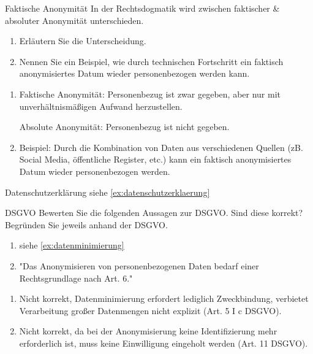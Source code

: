 \documentclass{article}
\begin{document}
\begin{exercise}{Faktische Anonymität}
  In der Rechtsdogmatik wird zwischen faktischer \& absoluter Anonymität unterschieden.
  \begin{enumerate}
    \item Erläutern Sie die Unterscheidung.
    \item Nennen Sie ein Beispiel, wie durch technischen Fortschritt ein faktisch anonymisiertes Datum wieder personenbezogen werden kann.
  \end{enumerate}

  \begin{solution}
    \begin{enumerate}
      \item Faktische Anonymität: Personenbezug ist zwar gegeben, aber nur mit unverhältnismäßigen Aufwand herzustellen.\par Absolute Anonymität: Personenbezug ist nicht gegeben.
      \item Beispiel: Durch die Kombination von Daten aus verschiedenen Quellen (zB. Social Media, öffentliche Register, etc.) kann ein faktisch anonymisiertes Datum wieder personenbezogen werden.
    \end{enumerate}
  \end{solution}
\end{exercise}

\begin{exercise}{Datenschutzerklärung}
  siehe \ref{ex:datenschutzerklaerung}
\end{exercise}

\begin{exercise}[2]{DSGVO}
  Bewerten Sie die folgenden Aussagen zur DSGVO. Sind diese korrekt? Begründen Sie jeweils anhand der DSGVO.
  \begin{enumerate}
    \item siehe \ref{ex:datenminimierung}
    \item "Das Anonymisieren von personenbezogenen Daten bedarf einer Rechtsgrundlage nach Art. 6."
  \end{enumerate}

  \begin{solution}
    \begin{enumerate}
      \item Nicht korrekt, Datenminimierung erfordert lediglich Zweckbindung, verbietet Verarbeitung großer Datenmengen nicht explizit (Art. 5 I c DSGVO).
      \item Nicht korrekt, da bei der Anonymisierung keine Identifizierung mehr erforderlich ist, muss keine Einwilligung eingeholt werden (Art. 11 DSGVO).
    \end{enumerate}
  \end{solution}
\end{exercise}
\end{document}
